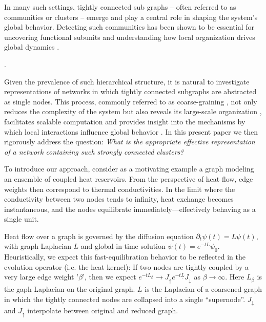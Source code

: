 \documentclass[reqno,12pt,letterpaper]{amsart}
\numberwithin{equation}{section}
\newcommand{\1}{\mathds{1}}
\theoremstyle{definition}
\begin{document}
In many such settings, tightly connected sub graphs -- often referred to as communities or clusters -- emerge and play a central role in shaping the system’s global behavior. Detecting such communities has been shown to be essential for uncovering functional subunits and understanding how local organization drives global dynamics \cite{fortunato2007resolution, newman2006modularity, fortunato2010community, nematzadeh2014optimal, onella2007structure}.

.

Given the prevalence of such hierarchical structure, it 
is natural to investigate
representations of networks in which tightly connected subgraphs are abstracted as single nodes. This process, commonly referred to as coarse-graining \cite{Loukas2019, Safro2015}, not only reduces the complexity of the system but also reveals its large-scale organization \cite{Villegas2023, Poggialini2025},
facilitates scalable computation \cite{10.24963/ijcai.2023/752, 10.1145/3447548.3467256} and provides insight into the mechanisms by which local interactions influence global behavior \cite{PhysRevResearch.4.033196, PhysRevResearch.7.013065}.
In this present paper  we then rigorously address the question: \emph{What is the appropriate effective representation of a network containing such strongly connected clusters?}


\medskip

 To introduce our approach, consider as a motivating example a graph modeling an ensemble of coupled heat reservoirs. From the perspective of heat flow, edge weights then correspond to thermal conductivities. In the limit where the conductivity between two nodes tends to infinity, heat exchange becomes instantaneous, and the nodes equilibrate immediately---effectively behaving as a single unit. 
 
 \medskip
 
Heat flow over a graph is governed by the diffusion equation
$
	\partial_t \psi(t) = L \psi(t)
$, with graph Laplacian $L$ and global-in-time solution $\psi(t) = e^{-t L} \psi_0$. Heuristically, we expect this fast-equilibration behavior to be reflected  in the evolution operator (i.e. the heat kernel): If two nodes are tightly coupled by a very large edge weight '$\beta$', then we expect
$
	e^{-t L_\beta} \rightarrow J_\uparrow e^{-t \underline{L}} J_\downarrow
$ as $\beta \rightarrow \infty$. Here $L_\beta$  is the gaph Laplacian on the original graph.
 $\underline{L}$ is the Laplacian of a coarsened graph in which the tightly connected nodes are collapsed into a single ``supernode''. $J_\downarrow$ and $J_\uparrow$ interpolate between original and reduced graph.
\end{document}

